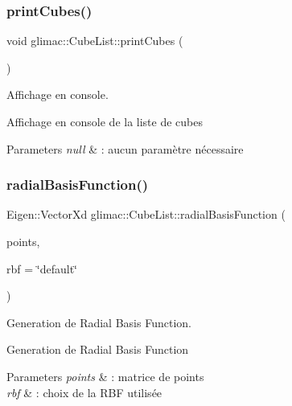 \subsubsection{\texorpdfstring{print\+Cubes()}{printCubes()}}
{\footnotesize\ttfamily void glimac\+::\+Cube\+List\+::print\+Cubes (\begin{DoxyParamCaption}{ }\end{DoxyParamCaption})}



Affichage en console. 

Affichage en console de la liste de cubes


\begin{DoxyParams}{Parameters}
{\em null} & \+: aucun paramètre nécessaire \\
\hline
\end{DoxyParams}
\mbox{\label{classglimac_1_1CubeList_a365df432965d53d0ed146fd8bcc270cf}} 
\subsubsection{\texorpdfstring{radial\+Basis\+Function()}{radialBasisFunction()}}
{\footnotesize\ttfamily Eigen\+::\+Vector\+Xd glimac\+::\+Cube\+List\+::radial\+Basis\+Function (\begin{DoxyParamCaption}\item[{Eigen\+::\+Matrix\+Xd}]{points,  }\item[{std\+::string}]{rbf = {\ttfamily \char`\"{}default\char`\"{}} }\end{DoxyParamCaption})}



Generation de Radial Basis Function. 

Generation de Radial Basis Function


\begin{DoxyParams}{Parameters}
{\em points} & \+: matrice de points \\
\hline
{\em rbf} & \+: choix de la R\+BF utilisée \\
\hline
\end{DoxyParams}
\mbox{\label{classglimac_1_1CubeList_a59d87cac2e218d617940ccdab5235b31}} 

